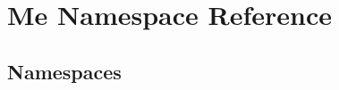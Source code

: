 \hypertarget{namespaceMe}{}\section{Me Namespace Reference}
\label{namespaceMe}
\subsection*{Namespaces}
\begin{DoxyCompactItemize}
\end{DoxyCompactItemize}
